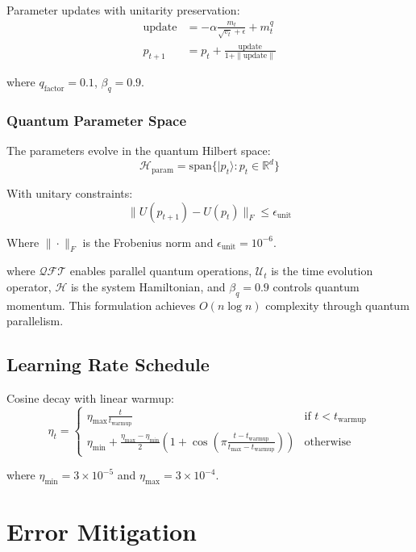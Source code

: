 \documentclass{article}
\begin{document}
Parameter updates with unitarity preservation:
\begin{align*}
\text{update} &= -\alpha\frac{m_t}{\sqrt{v_t} + \epsilon} + m^q_t \\
p_{t+1} &= p_t + \frac{\text{update}}{1 + \|\text{update}\|}
\end{align*}

where $q_{\text{factor}}=0.1$, $\beta_q=0.9$.

\subsubsection{Quantum Parameter Space}
The parameters evolve in the quantum Hilbert space:
\begin{equation}
\mathcal{H}_{\text{param}} = \text{span}\{|p_t\rangle : p_t \in \mathbb{R}^d\}
\end{equation}

With unitary constraints:
\begin{equation}
\|U(p_{t+1}) - U(p_t)\|_F \leq \epsilon_{\text{unit}}
\end{equation}

Where $\|\cdot\|_F$ is the Frobenius norm and $\epsilon_{\text{unit}}=10^{-6}$.

where $\mathcal{QFT}$ enables parallel quantum operations, $\mathcal{U}_t$ is the time evolution operator, $\mathcal{H}$ is the system Hamiltonian, and $\beta_q=0.9$ controls quantum momentum. This formulation achieves $O(n\log n)$ complexity through quantum parallelism.

\subsection{Learning Rate Schedule}
Cosine decay with linear warmup:
\begin{equation}
\eta_t = \begin{cases}
\eta_{\text{max}}\frac{t}{t_{\text{warmup}}} & \text{if } t < t_{\text{warmup}} \\
\eta_{\text{min}} + \frac{\eta_{\text{max}}-\eta_{\text{min}}}{2}(1 + \cos(\pi\frac{t-t_{\text{warmup}}}{t_{\text{max}}-t_{\text{warmup}}})) & \text{otherwise}
\end{cases}
\end{equation}

where $\eta_{\text{min}}=3\times10^{-5}$ and $\eta_{\text{max}}=3\times10^{-4}$.

\section{Error Mitigation}
\end{document}
